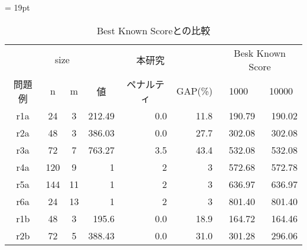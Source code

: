 \begin{landscape}
\begin{table}[]
\tabcolsep = 19pt
\renewcommand{\arraystretch}{0.8}
\caption{Best Known Scoreとの比較}
\label{cordeau}
\begin{tabular}{ccclllll}
\hline
        & \multicolumn{2}{c}{size}                    & \multicolumn{3}{c}{本研究}                                                        & \multicolumn{2}{c}{Besk Known Score}                       \\ \cline{2-8}
問題例     & n                    & m                    & \multicolumn{1}{c}{値} & \multicolumn{1}{c}{ペナルティ} & \multicolumn{1}{c}{GAP(\%)} & \multicolumn{1}{c}{1000} & \multicolumn{1}{c}{10000} \\ \cline{2-8}
r1a     & 24                   & 3                    & \multicolumn{1}{r}{212.49}    & \multicolumn{1}{r}{0.0}     & \multicolumn{1}{r}{11.8}   & \multicolumn{1}{r}{190.79}    & \multicolumn{1}{r}{190.02}     \\
r2a     & 48                   & 3                    & \multicolumn{1}{r}{386.03}    & \multicolumn{1}{r}{0.0}     & \multicolumn{1}{r}{27.7}   & \multicolumn{1}{r}{302.08}    & \multicolumn{1}{r}{302.08}     \\
r3a     & 72                   & 7                   & \multicolumn{1}{r}{763.27}    & \multicolumn{1}{r}{3.5}     & \multicolumn{1}{r}{43.4}   & \multicolumn{1}{r}{532.08}    & \multicolumn{1}{r}{532.08}     \\
r4a     & 120                   & 9                  & \multicolumn{1}{r}{1}    & \multicolumn{1}{r}{2}     & \multicolumn{1}{r}{3}   & \multicolumn{1}{r}{572.68}    & \multicolumn{1}{r}{572.78}     \\
r5a     & 144                  & 11                   & \multicolumn{1}{r}{1}    & \multicolumn{1}{r}{2}     & \multicolumn{1}{r}{3}   & \multicolumn{1}{r}{636.97}    & \multicolumn{1}{r}{636.97}     \\
r6a     & 24                   & 13                    & \multicolumn{1}{r}{1}    & \multicolumn{1}{r}{2}     & \multicolumn{1}{r}{3}   & \multicolumn{1}{r}{801.40}    & \multicolumn{1}{r}{801.40}     \\
r1b    & 48                  & 3                    & \multicolumn{1}{r}{195.6}    & \multicolumn{1}{r}{0.0}     & \multicolumn{1}{r}{18.9}   & \multicolumn{1}{r}{164.72}    & \multicolumn{1}{r}{164.46}     \\
r2b     & 72                  & 5                  & \multicolumn{1}{r}{388.43}    & \multicolumn{1}{r}{0.0}     & \multicolumn{1}{r}{31.0}   & \multicolumn{1}{r}{301.28}    & \multicolumn{1}{r}{296.06}     \\

\end{tabular}
\end{table}
\end{landscape}
